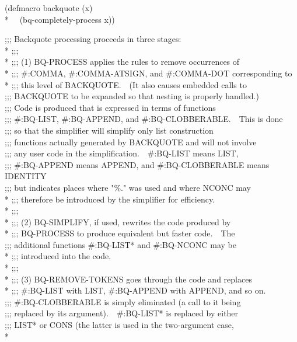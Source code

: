 \begin{new}
\begin{lisp}
(defmacro backquote (x) \\*
~~(bq-completely-process x))
\end{lisp}
\begin{lisp}
;;; Backquote processing proceeds in three stages: \\*
;;; \\*
;;; (1) BQ-PROCESS applies the rules to remove occurrences of \\*
;;; \#:COMMA, \#:COMMA-ATSIGN, and \#:COMMA-DOT corresponding to \\*
;;; this level of BACKQUOTE.~~(It also causes embedded calls to \\
;;; BACKQUOTE to be expanded so that nesting is properly handled.) \\
;;; Code is produced that is expressed in terms of functions \\
;;; \#:BQ-LIST, \#:BQ-APPEND, and \#:BQ-CLOBBERABLE.~~This is done \\
;;; so that the simplifier will simplify only list construction \\
;;; functions actually generated by BACKQUOTE and will not involve \\
;;; any user code in the simplification.~~\#:BQ-LIST means LIST, \\
;;; \#:BQ-APPEND means APPEND, and \#:BQ-CLOBBERABLE means IDENTITY \\
;;; but indicates places where "\%." was used and where NCONC may \\*
;;; therefore be introduced by the simplifier for efficiency. \\*
;;; \\*
;;; (2) BQ-SIMPLIFY, if used, rewrites the code produced by \\*
;;; BQ-PROCESS to produce equivalent but faster code.~~The \\
;;; additional functions \#:BQ-LIST* and \#:BQ-NCONC may be \\*
;;; introduced into the code. \\*
;;; \\*
;;; (3) BQ-REMOVE-TOKENS goes through the code and replaces \\*
;;; \#:BQ-LIST with LIST, \#:BQ-APPEND with APPEND, and so on. \\
;;; \#:BQ-CLOBBERABLE is simply eliminated (a call to it being \\
;;; replaced by its argument).~~\#:BQ-LIST* is replaced by either \\
;;; LIST* or CONS (the latter is used in the two-argument case, \\*

\end{lisp}
\end{new}
